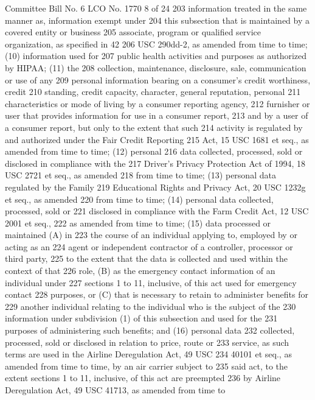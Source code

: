 Committee Bill No. 6
LCO No. 1770 8 of 24
203 information treated in the same manner as, information exempt under
204 this subsection that is maintained by a covered entity or business
205 associate, program or qualified service organization, as specified in 42
206 USC 290dd-2, as amended from time to time; (10) information used for
207 public health activities and purposes as authorized by HIPAA; (11) the
208 collection, maintenance, disclosure, sale, communication or use of any
209 personal information bearing on a consumer's credit worthiness, credit
210 standing, credit capacity, character, general reputation, personal
211 characteristics or mode of living by a consumer reporting agency,
212 furnisher or user that provides information for use in a consumer report,
213 and by a user of a consumer report, but only to the extent that such
214 activity is regulated by and authorized under the Fair Credit Reporting
215 Act, 15 USC 1681 et seq., as amended from time to time; (12) personal
216 data collected, processed, sold or disclosed in compliance with the
217 Driver's Privacy Protection Act of 1994, 18 USC 2721 et seq., as amended
218 from time to time; (13) personal data regulated by the Family
219 Educational Rights and Privacy Act, 20 USC 1232g et seq., as amended
220 from time to time; (14) personal data collected, processed, sold or
221 disclosed in compliance with the Farm Credit Act, 12 USC 2001 et seq.,
222 as amended from time to time; (15) data processed or maintained (A) in
223 the course of an individual applying to, employed by or acting as an
224 agent or independent contractor of a controller, processor or third party,
225 to the extent that the data is collected and used within the context of that
226 role, (B) as the emergency contact information of an individual under
227 sections 1 to 11, inclusive, of this act used for emergency contact
228 purposes, or (C) that is necessary to retain to administer benefits for
229 another individual relating to the individual who is the subject of the
230 information under subdivision (1) of this subsection and used for the
231 purposes of administering such benefits; and (16) personal data
232 collected, processed, sold or disclosed in relation to price, route or
233 service, as such terms are used in the Airline Deregulation Act, 49 USC
234 40101 et seq., as amended from time to time, by an air carrier subject to
235 said act, to the extent sections 1 to 11, inclusive, of this act are preempted
236 by Airline Deregulation Act, 49 USC 41713, as amended from time to 

